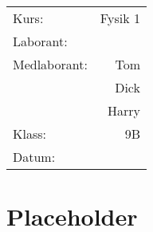 \makeatletter
\begin{titlepage}
	\vspace*{\fill}
	\centering
	{\huge \@title}
	\vspace{\fill}

	\begin{flushright}
		\begin{tabular}{ lr }
			Kurs: & Fysik 1 \\
			Laborant: & \@author \\
			Medlaborant: &
			Tom \\
			& Dick \\
			& Harry \\
			Klass: & 9B \\
			Datum: & \@date \\
		\end{tabular}
	\end{flushright}
\end{titlepage}
\makeatother

\begin{abstract}
	\blindtext
\end{abstract}

\newpage\tableofcontents\newpage

\section{Placeholder}
\blindtext
\cite{example2021}

\printbibliography
